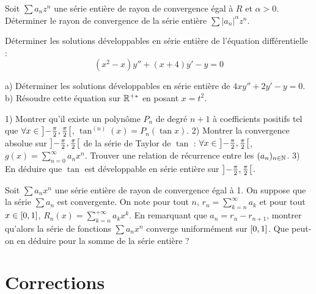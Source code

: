 \begin{exercice}
Soit $\sum a_{n}z^{n}$ une série entière de rayon de convergence égal à $R$ et $\alpha>0$. 
Déterminer le rayon de convergence de la série entière $\sum|a_{n}|^{\alpha}z^{n}$. 
\end{exercice}

\begin{exercice}
Déterminer les solutions développables en série entière de l'équation différentielle :
$$ (x^{2}-x)y''+(x+4)y'-y=0 $$ 
\end{exercice}

\begin{exercice}
a) Déterminer les solutions développables en série entière de $4xy''+2y'-y=0$. 
b) Résoudre cette équation sur $\mathbb{R}^{+*}$ en posant $x=t^{2}$. 
\end{exercice}

\begin{exercice}
1) Montrer qu'il existe un polynôme $P_{n}$ de degré $n+1$ à coefficients positifs tel que $\forall x\in\left]-\frac{\pi}{2}, \frac{\pi}{2}\right[$, $\tan^{(n)}(x)=P_{n}(\tan x)$. 
2) Montrer la convergence absolue sur $\left]-\frac{\pi}{2}, \frac{\pi}{2}\right[$ de la série de Taylor de $\tan$ : $\forall x\in\left]-\frac{\pi}{2}, \frac{\pi}{2}\right[$, $g(x)=\sum_{n=0}^{\infty}a_{n}x^{n}$. 
Trouver une relation de récurrence entre les $(a_{n})_{n\in\mathbb{N}}$. 
3) En déduire que $\tan$ est développable en série entière sur $\left]-\frac{\pi}{2}, \frac{\pi}{2}\right[$. 
\end{exercice}

\begin{exercice}
Soit $\sum a_{n}x^{n}$ une série entière de rayon de convergence égal à 1. 
On suppose que la série $\sum a_{n}$ est convergente. 
On note pour tout $n$, $r_{n}=\sum_{k=n}^{\infty}a_{k}$ et pour tout $x\in\left[0, 1\right]$, $R_{n}(x)=\sum_{k=n}^{+\infty}a_{k}x^{k}$. 
En remarquant que $a_{n}=r_{n}-r_{n+1}$, montrer qu'alors la série de fonctions $\sum a_{n}x^{n}$ converge uniformément sur $\left[0, 1\right]$. 
Que peut-on en déduire pour la somme de la série entière ? 
\end{exercice}


\section{Corrections}

